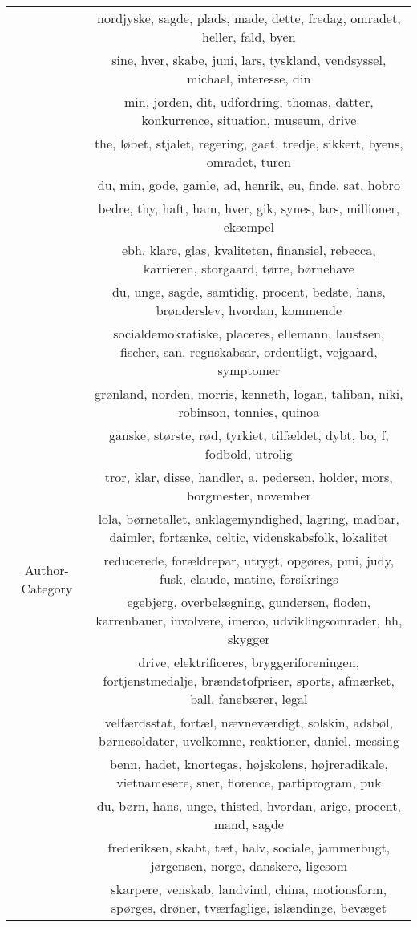 \begin{table}
\begin{tabular}{c|c}
		& nordjyske, sagde, plads, made, dette, fredag, omradet, heller, fald, byen \\
		& sine, hver, skabe, juni, lars, tyskland, vendsyssel, michael, interesse, din \\
		& min, jorden, dit, udfordring, thomas, datter, konkurrence, situation, museum, drive \\
		& the, løbet, stjalet, regering, gaet, tredje, sikkert, byens, omradet, turen \\
		& du, min, gode, gamle, ad, henrik, eu, finde, sat, hobro \\
		& bedre, thy, haft, ham, hver, gik, synes, lars, millioner, eksempel \\
		\midrule
		\multirow{15}{*}{Author-Category} & ebh, klare, glas, kvaliteten, finansiel, rebecca, karrieren, storgaard, tørre, børnehave \\
		& du, unge, sagde, samtidig, procent, bedste, hans, brønderslev, hvordan, kommende \\
		& socialdemokratiske, placeres, ellemann, laustsen, fischer, san, regnskabsar, ordentligt, vejgaard, symptomer \\
		& grønland, norden, morris, kenneth, logan, taliban, niki, robinson, tonnies, quinoa \\
		& ganske, største, rød, tyrkiet, tilfældet, dybt, bo, f, fodbold, utrolig \\
		& tror, klar, disse, handler, a, pedersen, holder, mors, borgmester, november \\
		& lola, børnetallet, anklagemyndighed, lagring, madbar, daimler, fortænke, celtic, videnskabsfolk, lokalitet \\
		& reducerede, forældrepar, utrygt, opgøres, pmi, judy, fusk, claude, matine, forsikrings \\
		& egebjerg, overbelægning, gundersen, floden, karrenbauer, involvere, imerco, udviklingsomrader, hh, skygger \\
		& drive, elektrificeres, bryggeriforeningen, fortjenstmedalje, brændstofpriser, sports, afmærket, ball, fanebærer, legal \\
		& velfærdsstat, fortæl, nævneværdigt, solskin, adsbøl, børnesoldater, uvelkomne, reaktioner, daniel, messing \\
		& benn, hadet, knortegas, højskolens, højreradikale, vietnamesere, sner, florence, partiprogram, puk \\
		& du, børn, hans, unge, thisted, hvordan, arige, procent, mand, sagde \\
		& frederiksen, skabt, tæt, halv, sociale, jammerbugt, jørgensen, norge, danskere, ligesom \\
		& skarpere, venskab, landvind, china, motionsform, spørges, drøner, tværfaglige, islændinge, bevæget \\
	\end{tabular}
\end{table}
